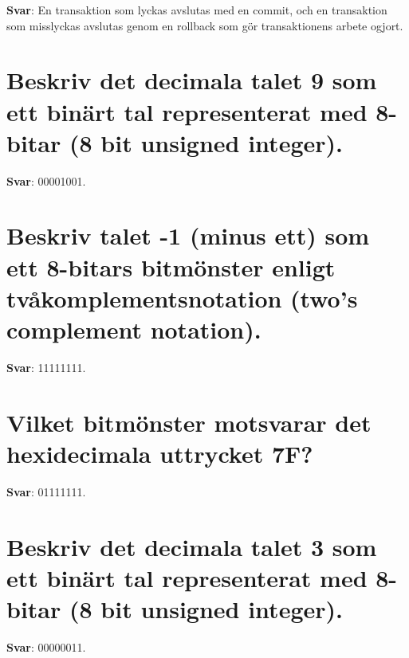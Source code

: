 \documentclass[a4paper,11pt,oneside]{book}
\begin{document}
\begin{sloppypar}
\label{q:346:sa:sv:True}

\textbf{Svar}: En transaktion som lyckas avslutas med en commit, och en transaktion som misslyckas avslutas genom en rollback som g\"or transaktionens arbete ogjort.





















\section{Beskriv det decimala talet 9 som ett bin\"art tal representerat med 8-bitar (8 bit unsigned integer).}

\label{q:357:sa:sv:True}

\textbf{Svar}: 00001001.



\section{Beskriv talet -1 (minus ett) som ett 8-bitars bitm\"onster enligt tv\r{a}komplementsnotation (two{\textquoteright}s complement notation).}

\label{q:358:sa:sv:True}

\textbf{Svar}: 11111111.



\section{Vilket bitm\"onster motsvarar det hexidecimala uttrycket 7F?}

\label{q:359:sa:sv:True}

\textbf{Svar}: 01111111.



\section{Beskriv det decimala talet 3 som ett bin\"art tal representerat med 8-bitar (8 bit unsigned integer).}

\label{q:360:sa:sv:True}

\textbf{Svar}: 00000011.




\end{sloppypar}
\end{document}
